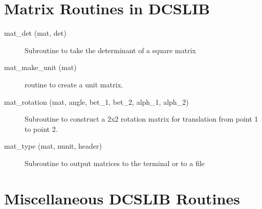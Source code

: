 \section{Matrix Routines in DCSLIB}
\label{r:dcs_matrix}      

\begin{description}

\item[mat\_det (mat, det)] \Newline 
     Subroutine to take the determinant of a square matrix

\item[mat\_make\_unit (mat)] \Newline 
     routine to create a unit matrix.

\item[mat\_rotation (mat, angle, bet\_1, bet\_2, alph\_1, alph\_2)] \Newline 
     Subroutine to construct a 2x2 rotation matrix for translation from
     point 1 to point 2.

\item[mat\_type (mat, nunit, header)] \Newline 
     Subroutine to output matrices to the terminal or to a file

\end{description}

\section{Miscellaneous DCSLIB Routines}
\label{r:dcs_misc}      

